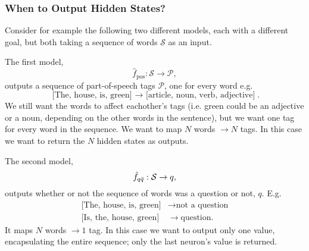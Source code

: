     \subsubsection{When to Output Hidden States?}
    Consider for example the following two different models, each with a different goal, but both taking a sequence of words $\mathcal{S}$ as an input.
    
    The first model,
    \begin{equation}
        \hat{f}_{\text{pos}}: \mathcal{S} \rightarrow \mathcal{P},
    \end{equation}
    outputs a sequence of part-of-speech tags $\mathcal{P}$, one for every word e.g.
        \begin{equation*}
        \text{[The, house, is, green] $\rightarrow$ [article, noun, verb, adjective]}.
        \end{equation*}
    We still want the words to affect eachother's tags (i.e. green could be an adjective or a noun, depending on the other words in the sentence), but we want one tag for every word in the sequence. We want to map $N$ words $ \rightarrow N$ tags. In this case we want to return the $N$ hidden states as outputs.
    
    The second model, 
    \begin{equation}
        \hat{f}_{q\Bar{q}}: \mathcal{S} \rightarrow q,
    \end{equation}
    outputs whether or not the sequence of words was a question or not, $q$. E.g.
        \begin{align*}
        \text{[The, house, is, green]} &\rightarrow \text{not a question}\\
        \text{[Is, the, house, green]} &\rightarrow \text{question}.
        \end{align*}
    It maps $N$ words $\rightarrow 1$ tag. In this case we want to output only one value, encapsulating the entire sequence; only the last neuron's value is returned.
    